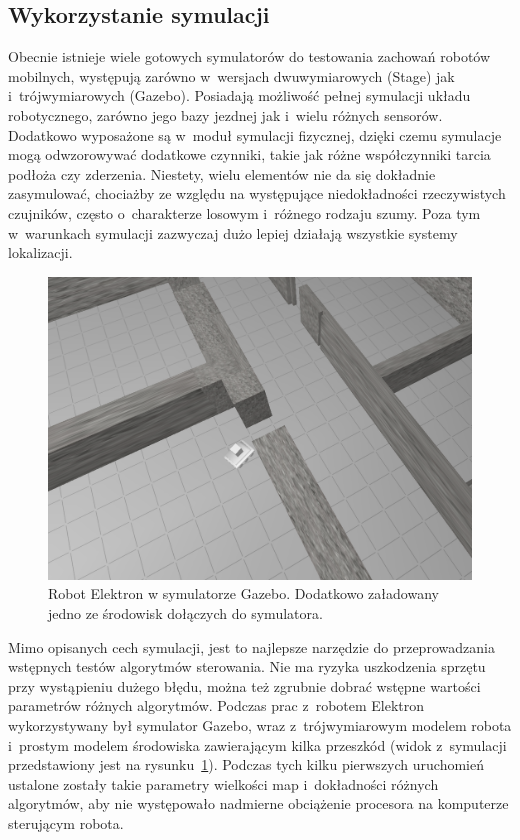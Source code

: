 \subsection{Wykorzystanie symulacji}

Obecnie istnieje wiele gotowych symulatorów do testowania zachowań robotów
mobilnych, występują zarówno w~wersjach dwuwymiarowych (Stage) jak i~trójwymiarowych
(Gazebo). Posiadają możliwość pełnej symulacji układu robotycznego, zarówno
jego bazy jezdnej jak i~wielu różnych sensorów. Dodatkowo wyposażone są 
w~moduł symulacji fizycznej, dzięki czemu symulacje mogą odwzorowywać dodatkowe
czynniki, takie jak różne współczynniki tarcia podłoża czy zderzenia. 
Niestety, wielu elementów nie da się dokładnie zasymulować, chociażby ze
względu na występujące niedokładności rzeczywistych czujników, często o~charakterze
losowym i~różnego rodzaju szumy. Poza tym w~warunkach symulacji zazwyczaj dużo
lepiej działają wszystkie systemy lokalizacji. 

\begin{figure}[htb!]
\centering
\includegraphics[width=13cm]{../img/gazebo}
\caption[Robot Elektron w symulatorze Gazebo]{Robot Elektron w symulatorze Gazebo.
Dodatkowo załadowany jedno ze środowisk dołączych do symulatora.}
\label{fig:gazebo}
\end{figure}

Mimo opisanych cech symulacji, jest to najlepsze narzędzie do przeprowadzania
wstępnych testów algorytmów sterowania. Nie ma ryzyka uszkodzenia sprzętu
przy wystąpieniu dużego błędu, można też zgrubnie dobrać wstępne wartości
parametrów różnych algorytmów. Podczas prac z~robotem Elektron wykorzystywany
był symulator Gazebo, wraz z~trójwymiarowym modelem robota i~prostym modelem
środowiska zawierającym kilka przeszkód (widok z~symulacji przedstawiony jest
na rysunku~\ref{fig:gazebo}). Podczas tych kilku pierwszych uruchomień
ustalone zostały takie parametry wielkości map i~dokładności różnych algorytmów,
aby nie występowało nadmierne obciążenie procesora na komputerze sterującym
robota.


